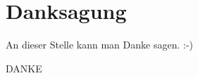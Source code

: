 \section*{Danksagung}
An dieser Stelle kann man Danke sagen. :-)
\vfill
\begin{center}
	\Large
	DANKE
\end{center}
\vfill